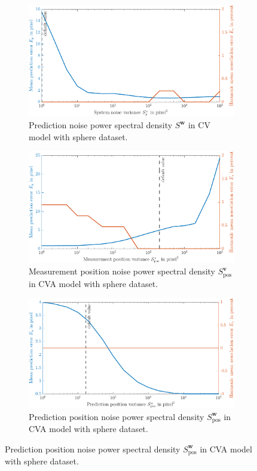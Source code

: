 \begin{figure}
    \ContinuedFloat
    \centering
	\begin{subfigure}[t]{0.8\textwidth}
		\includegraphics[width=\textwidth]{figures/KF/appendix/k cv precov.png}
		\caption{Prediction noise power spectral density     $S^{\boldsymbol{w}}$ in CV model with sphere dataset.}
	\end{subfigure}
	\begin{subfigure}[t]{0.8\textwidth}
		\includegraphics[width=\textwidth]{figures/KF/appendix/k cva meacov.png}
		\caption{Measurement position noise power spectral density     $S_{\mathrm{pos}}^{\boldsymbol{v}}$ in CVA model with sphere dataset.}
	\end{subfigure}
	\begin{subfigure}[t]{0.8\textwidth}
		\includegraphics[width=\textwidth]{figures/KF/appendix/k cva precov.png}
		\caption{Prediction position noise power spectral density     $S_{\mathrm{pos}}^{\boldsymbol{w}}$ in CVA model with sphere dataset.}
	\end{subfigure}
\end{figure}

